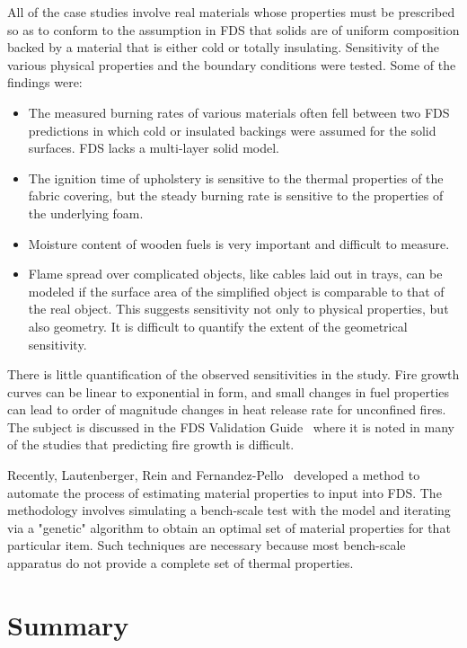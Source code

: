 \documentclass[11pt]{book}
\begin{document}
All of the  case studies involve real materials  whose properties must
be prescribed  so as to conform  to the assumption in  FDS that solids
are of uniform composition backed by a material that is either cold or
totally insulating. Sensitivity of the various physical properties and
the boundary conditions were tested. Some of the findings were:
\begin{itemize}
\item  The measured  burning  rates of  various  materials often  fell
between two FDS  predictions in which cold or  insulated backings were
assumed for the solid surfaces. FDS lacks a multi-layer solid model.
\item  The ignition  time of  upholstery is  sensitive to  the thermal
properties  of the  fabric covering,  but the  steady burning  rate is
sensitive to the properties of the underlying foam.
\item Moisture content of wooden fuels is very important and difficult
to measure.
\item Flame spread  over complicated objects, like cables  laid out in
trays, can be modeled if the  surface area of the simplified object is
comparable to that  of the real object. This  suggests sensitivity not
only to  physical properties,  but also geometry.  It is  difficult to
quantify the extent of the geometrical sensitivity.
\end{itemize}
There is  little quantification of  the observed sensitivities  in the
study. Fire  growth curves can be  linear to exponential  in form, and
small  changes in  fuel  properties  can lead  to  order of  magnitude
changes  in heat  release rate  for unconfined  fires. The  subject is
discussed  in the  FDS  Validation Guide~\cite{FDS_Validation_Guide_5}
where it is  noted in many of the studies  that predicting fire growth
is difficult.

Recently,              Lautenberger,              Rein             and
Fernandez-Pello~\cite{Lautenberger:FSJ} developed a method to automate
the process of  estimating material properties to input  into FDS. The
methodology involves simulating a  bench-scale test with the model and
iterating  via a  "genetic"  algorithm  to obtain  an  optimal set  of
material  properties for  that  particular item.  Such techniques  are
necessary because most bench-scale apparatus do not provide a complete
set of thermal properties.

\section{Summary}
\end{document}
